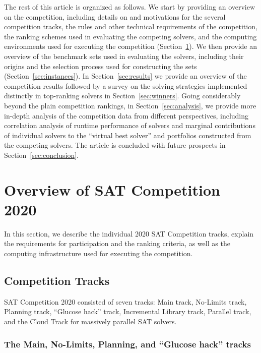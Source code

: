 \documentclass{elsarticle}
\begin{document}
The rest of this article is organized as follows. 
We start by providing an overview on the competition, including details on and motivations for the several
competition tracks, the rules and other technical requirements of the competition, the ranking schemes used
in evaluating the competing solvers, 
and the computing environments used for executing the competition
(Section~\ref{sec:overview}).
We then provide an overview of the benchmark sets used in evaluating the solvers, including their origins and the selection
process used for constructing the sets (Section~\ref{sec:instances}).
In Section~\ref{sec:results} we provide an overview of the competition results %
followed by a survey on 
the solving strategies implemented distinctly in top-ranking solvers in Section~\ref{sec:winners}. 
Going considerably beyond the plain competition rankings, in Section~\ref{sec:analysis}, we provide more in-depth analysis of the competition 
data from different perspectives, including correlation analysis of runtime performance of solvers and marginal contributions
of individual solvers to the ``virtual best solver'' and 
portfolios constructed from the competing solvers.
The article is concluded with future prospects in Section~\ref{sec:conclusion}.


\section{Overview of SAT Competition 2020}
\label{sec:overview}

In this section, we describe the individual 2020 SAT Competition tracks,
explain the requirements for participation %
and the ranking criteria, as well as
the computing infrastructure used for executing the competition.

\subsection{Competition Tracks}

SAT Competition 2020 consisted of seven tracks:
Main track, No-Limits track, Planning track, ``Glucose hack'' track,
Incremental Library track, Parallel track,
and the Cloud Track for massively parallel SAT solvers. %

\subsubsection{The Main, No-Limits, Planning, and ``Glucose hack'' tracks}
\end{document}
